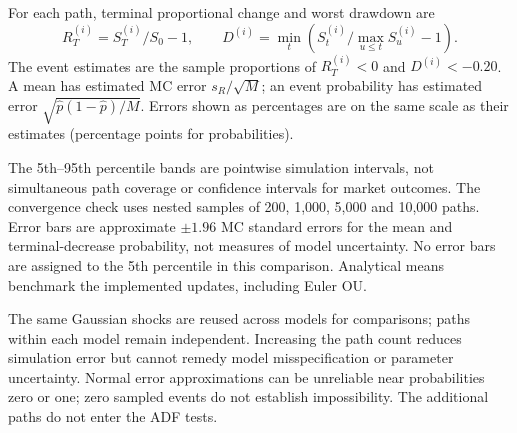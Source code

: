 \documentclass[11pt,a4paper]{article}
\begin{document}
For each path, terminal proportional change and worst drawdown are
\[
R_T^{(i)}=S_T^{(i)}/S_0-1,\qquad
D^{(i)}=\min_t\left(S_t^{(i)}/\max_{u\leq t}S_u^{(i)}-1\right).
\]
The event estimates are the sample proportions of $R_T^{(i)}<0$ and
$D^{(i)}<-0.20$. A mean has estimated MC error
$s_R/\sqrt{M}$; an event probability has estimated error
$\sqrt{\hat p(1-\hat p)/M}$. Errors shown as percentages are on the same
scale as their estimates (percentage points for probabilities).
\begin{table}[htbp]\centering
\caption{Conditional two-year Monte Carlo outcomes.}
\end{table}

The 5th--95th percentile bands are pointwise simulation intervals, not
simultaneous path coverage or confidence intervals for market outcomes.
The convergence check uses nested samples of 200, 1,000, 5,000 and 10,000
paths. Error bars are approximate $\pm1.96$ MC standard errors for the mean
and terminal-decrease probability, not measures of model uncertainty.
No error bars are assigned to the 5th percentile in this comparison.
Analytical means benchmark the implemented updates, including Euler OU.

The same Gaussian shocks are reused across models for comparisons;
paths within each model remain independent. Increasing the path count
reduces simulation error but cannot remedy model misspecification or
parameter uncertainty. Normal error approximations can be unreliable near
probabilities zero or one; zero sampled events do not establish impossibility.
The additional paths do not enter the ADF tests.
\end{document}
